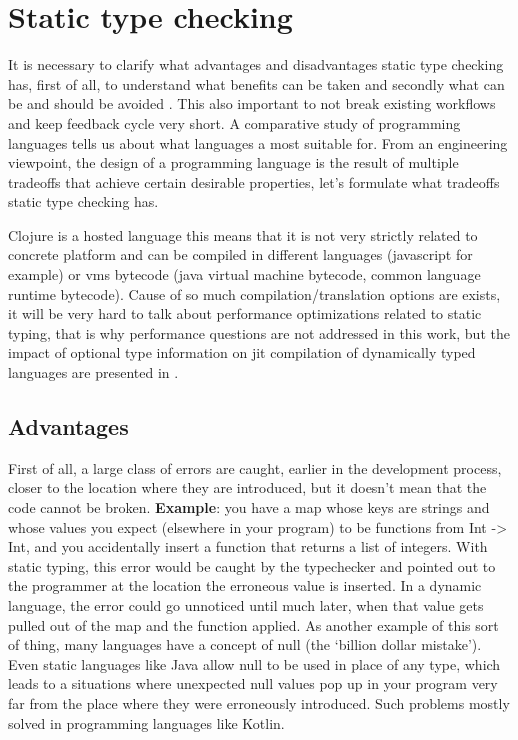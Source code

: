 \section{Static type checking}
It is necessary to clarify what advantages and disadvantages static type
checking has, first of all, to understand what benefits can be taken and
secondly what can be and should be avoided \cite{staticvsdynamic}. This also
important to not break existing workflows and keep feedback cycle very short. A
comparative study of programming languages \cite{nanz2015comparative} tells us
about what languages a most suitable for. From an engineering viewpoint, the
design of a programming language is the result of multiple tradeoffs that
achieve certain desirable properties, let's formulate what tradeoffs static type
checking has.

Clojure is a hosted language this means that it is not very strictly related to
concrete platform and can be compiled in different languages (javascript for
example) or vms bytecode (java virtual machine bytecode, common language runtime
bytecode). Cause of so much compilation/translation options are exists, it will
be very hard to talk about performance optimizations related to static typing,
that is why performance questions are not addressed in this work, but the impact
of optional type information on jit compilation of dynamically typed languages
are presented in \cite{chang2011impact}.

\subsection{Advantages}
First of all, a large class of errors are caught, earlier in the development
process, closer to the location where they are introduced, but it doesn't mean
that the code cannot be broken. \textbf{Example}: you have a map whose keys are
strings and whose values you expect (elsewhere in your program) to be functions
from Int -> Int, and you accidentally insert a function that returns a list of
integers. With static typing, this error would be caught by the typechecker and
pointed out to the programmer at the location the erroneous value is inserted.
In a dynamic language, the error could go unnoticed until much later, when that
value gets pulled out of the map and the function applied. As another example of
this sort of thing, many languages have a concept of null (the ‘billion dollar
mistake’). Even static languages like Java allow null to be used in place of any
type, which leads to a situations where unexpected null values pop up in your
program very far from the place where they were erroneously introduced. Such
problems mostly solved in programming languages like Kotlin.

